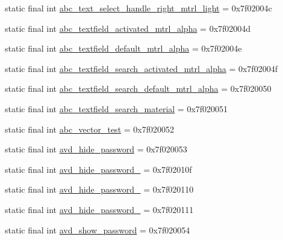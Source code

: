\begin{CompactItemize}
static final int \hyperlink{classandroid_1_1support_1_1graphics_1_1drawable_1_1_r_1_1drawable_dc2157ab611e84e6121b49d7c4a22d6f}{abc\_\-text\_\-select\_\-handle\_\-right\_\-mtrl\_\-light} = 0x7f02004c
\item 
static final int \hyperlink{classandroid_1_1support_1_1graphics_1_1drawable_1_1_r_1_1drawable_f96412b247db34d0051e2684d90aee23}{abc\_\-textfield\_\-activated\_\-mtrl\_\-alpha} = 0x7f02004d
\item 
static final int \hyperlink{classandroid_1_1support_1_1graphics_1_1drawable_1_1_r_1_1drawable_ccaa06431d0c50720c769b0554f34dc4}{abc\_\-textfield\_\-default\_\-mtrl\_\-alpha} = 0x7f02004e
\item 
static final int \hyperlink{classandroid_1_1support_1_1graphics_1_1drawable_1_1_r_1_1drawable_bcdd771d45a50b32fee13f5fe4a1192d}{abc\_\-textfield\_\-search\_\-activated\_\-mtrl\_\-alpha} = 0x7f02004f
\item 
static final int \hyperlink{classandroid_1_1support_1_1graphics_1_1drawable_1_1_r_1_1drawable_07b90caa547ffaf77bbacf1161d4d34b}{abc\_\-textfield\_\-search\_\-default\_\-mtrl\_\-alpha} = 0x7f020050
\item 
static final int \hyperlink{classandroid_1_1support_1_1graphics_1_1drawable_1_1_r_1_1drawable_0224004889a19b3c684232c7971cb883}{abc\_\-textfield\_\-search\_\-material} = 0x7f020051
\item 
static final int \hyperlink{classandroid_1_1support_1_1graphics_1_1drawable_1_1_r_1_1drawable_4973c9b1d811e6f83ea1b2ad68889daa}{abc\_\-vector\_\-test} = 0x7f020052
\item 
static final int \hyperlink{classandroid_1_1support_1_1graphics_1_1drawable_1_1_r_1_1drawable_6a89aaa5f80760fab284776c6a1236f6}{avd\_\-hide\_\-password} = 0x7f020053
\item 
static final int \hyperlink{classandroid_1_1support_1_1graphics_1_1drawable_1_1_r_1_1drawable_af9a7da0966c866ba667049cbc479ae3}{avd\_\-hide\_\-password\_} = 0x7f02010f
\item 
static final int \hyperlink{classandroid_1_1support_1_1graphics_1_1drawable_1_1_r_1_1drawable_04d079dc2762a32708bd04e857009822}{avd\_\-hide\_\-password\_} = 0x7f020110
\item 
static final int \hyperlink{classandroid_1_1support_1_1graphics_1_1drawable_1_1_r_1_1drawable_e7d12e3fef957c675d6085777706bb40}{avd\_\-hide\_\-password\_} = 0x7f020111
\item 
static final int \hyperlink{classandroid_1_1support_1_1graphics_1_1drawable_1_1_r_1_1drawable_a446c5ea3e82e648682710fc1c1d6e85}{avd\_\-show\_\-password} = 0x7f020054

\end{CompactItemize}
